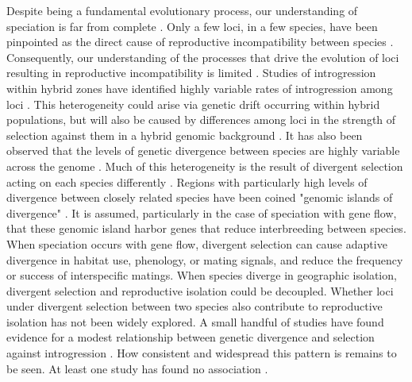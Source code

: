 Despite being a fundamental evolutionary process, our understanding of speciation 
is far from complete \parencite{butlin2011}. 
Only a few loci, in a few species, have been pinpointed as the direct cause of 
reproductive incompatibility between species \parencite{blackman2016,nosil2011}.
Consequently, our understanding of the processes that drive the evolution of loci
resulting in reproductive incompatibility is limited \parencite{butlin2011}. 
Studies of introgression within hybrid zones have identified highly variable
rates of introgression among loci \parencite{barton1985,gompert2017}.
This heterogeneity could arise via genetic drift occurring within hybrid populations,
but will also be caused by differences among loci in the strength of selection 
against them in a hybrid genomic background \parencite{barton1985,gompert2017}. 
It has also been observed that the levels of genetic divergence between species 
are highly variable across the genome \parencite{nosil2009}.
Much of this heterogeneity is the result of divergent selection acting on each 
species differently \parencite{nosil2009}.
Regions with particularly high levels of divergence between closely related species have been 
coined "genomic islands of divergence" \parencite{wolf2017}. 
It is assumed, particularly in the case of speciation with gene flow, that these
genomic island harbor genes that reduce interbreeding between species. 
When speciation occurs with gene flow, divergent selection can cause 
adaptive divergence in habitat use, phenology, or mating signals, and reduce the
frequency or success of interspecific matings. 
When species diverge in geographic isolation, divergent selection and reproductive
isolation could be decoupled.
Whether loci under divergent selection between two species also contribute to 
reproductive isolation has not been widely explored.
A small handful of studies have found evidence for a modest relationship between 
genetic divergence and selection against introgression \parencite{nikolakis2022,gompert2012a,parchman2013,larson2013}.
How consistent and widespread this pattern is remains to be seen.
At least one study has found no association \parencite{jahner2021}.


